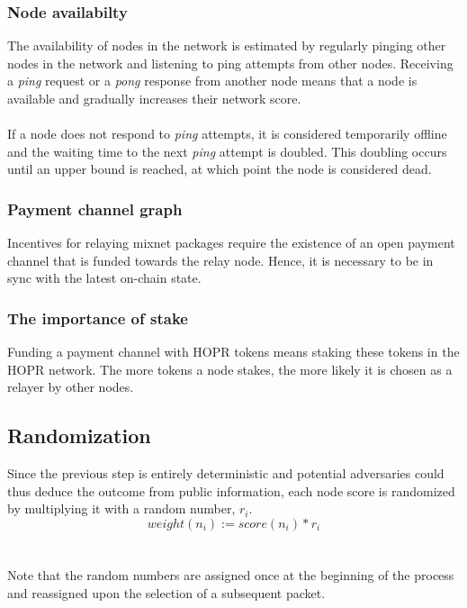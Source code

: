 \subsubsection{Node availabilty}

The availability of nodes in the network is estimated by regularly pinging other nodes in the network and listening to ping attempts from other nodes. Receiving a \textit{ping} request or a \textit{pong} response from another node means that a node is available and gradually increases their network score.
\\~\\If a node does not respond to \textit{ping} attempts, it is considered temporarily offline and the waiting time to the next \textit{ping} attempt is doubled. This doubling occurs until an upper bound is reached, at which point the node is considered dead.

\subsubsection{Payment channel graph}

Incentives for relaying mixnet packages require the existence of an open payment channel that is funded towards the relay node. Hence, it is necessary to be in sync with the latest on-chain state.

\subsubsection{The importance of stake}

Funding a payment channel with HOPR tokens means staking these tokens in the HOPR network. The more tokens a node stakes, the more likely it is chosen as a relayer by other nodes.

\subsection{Randomization}
\label{sec:path-selection:randomization}

Since the previous step is entirely deterministic and potential adversaries could thus deduce the outcome from public information, each node score is randomized by multiplying it with a random number, $r_i$.
$$weight(n_i) := score(n_i) * r_i$$
\\~\\Note that the random numbers are assigned once at the beginning of the process and reassigned upon the selection of a subsequent packet.

